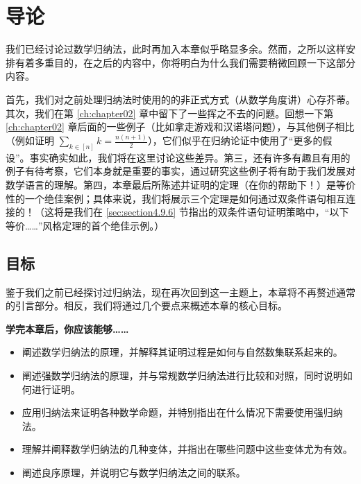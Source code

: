 \section{导论}

我们已经讨论过数学归纳法，此时再加入本章似乎略显多余。然而，之所以这样安排有着多重目的，在之后的内容中，你将明白为什么我们需要稍微回顾一下这部分内容。

首先，我们对之前处理归纳法时使用的的非正式方式（从数学角度讲）心存芥蒂。其次，我们在第 \ref{ch:chapter02} 章中留下了一些挥之不去的问题。回想一下第 \ref{ch:chapter02} 章后面的一些例子（比如拿走游戏和汉诺塔问题），与其他例子相比（例如证明 $\sum_{k \in [n]} k=\frac{n(n+1)}{2}$），它们似乎在归纳论证中使用了``更多的假设''。事实确实如此，我们将在这里讨论这些差异。第三，还有许多有趣且有用的例子有待考察，它们本身就是重要的事实，通过研究这些例子将有助于我们发展对数学语言的理解。第四，本章最后所陈述并证明的定理（在你的帮助下！）是等价性的一个绝佳案例；具体来说，我们将展示三个定理是如何通过双条件语句相互连接的！（这将是我们在 \ref{sec:section4.9.6} 节指出的双条件语句证明策略中，``以下等价……''风格定理的首个绝佳示例。）

\subsection{目标}

鉴于我们之前已经探讨过归纳法，现在再次回到这一主题上，本章将不再赘述通常的引言部分。相反，我们将通过几个要点来概述本章的核心目标。

\textbf{学完本章后，你应该能够……}

\begin{itemize}
    \item 阐述数学归纳法的原理，并解释其证明过程是如何与自然数集联系起来的。
    \item 阐述强数学归纳法的原理，并与常规数学归纳法进行比较和对照，同时说明如何进行证明。
    \item 应用归纳法来证明各种数学命题，并特别指出在什么情况下需要使用强归纳法。
    \item 理解并阐释数学归纳法的几种变体，并指出在哪些问题中这些变体尤为有效。
    \item 阐述良序原理，并说明它与数学归纳法之间的联系。
\end{itemize}